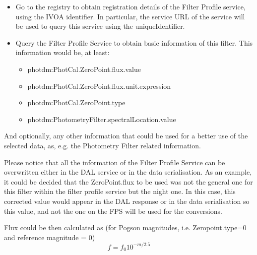\documentclass[11pt,a4paper]{ivoa}
\begin{document}
\begin{itemize}
	\item{Go to the registry to obtain registration details of the Filter Profile service, 
	using the IVOA identifier. In particular, the service URL of the service will be used 
	to query this service using the uniqueIdentifier.\par}

	\item{Query the Filter Profile Service to obtain basic information of this filter. This 
	information would be, at least:\par}

\begin{itemize}
	\item photdm:PhotCal.ZeroPoint.flux.value\par

	\item photdm:PhotCal.ZeroPoint.flux.unit.expression\par

	\item photdm:PhotCal.ZeroPoint.type\par

	\item photdm:PhotometryFilter.spectralLocation.value
\end{itemize}
\end{itemize}\par

And optionally, any other information that could be used for a better use of the selected 
data, as, e.g. the Photometry Filter related information.
\par

Please notice that all the information of the Filter Profile Service can be overwritten 
either in the DAL service or in the data serialisation. As an example, it could be 
decided that the ZeroPoint.flux to be used was not the general one for this filter 
within the filter profile service but the night one. In this case, this corrected 
value would appear in the DAL response or in the data serialisation so this value, 
and not the one on the FPS will be used for the conversions.
\par

Flux could be then calculated as (for Pogson magnitudes, i.e. Zeropoint.type=0 and 
reference magnitude = 0)
\begin{equation} \label{eq:33}
f = f_0 10^{-m/2.5}
\end{equation}
\end{document}
